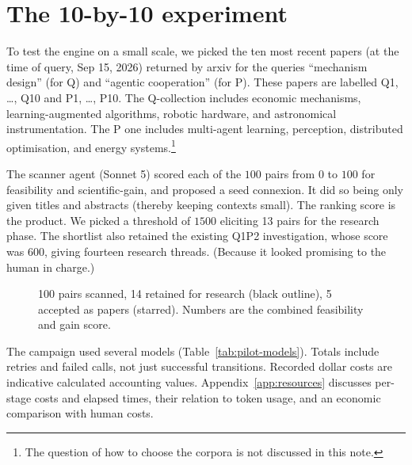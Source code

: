 \documentclass[11pt,a4paper]{article}
\newcommand{\pair}[1]{\mbox{#1}}
\begin{document}
\section{The 10-by-10 experiment}
\label{sec:pilot}


To test the engine on a small scale,
we picked the ten most recent papers (at the time of query, Sep 15, 2026)
returned by arxiv for the
queries ``mechanism design'' (for Q) and ``agentic cooperation'' (for P). These
papers are labelled Q1, \ldots, Q10 and P1, \ldots, P10. The Q-collection includes
economic mechanisms, learning-augmented algorithms, robotic hardware, and
astronomical instrumentation. The P one includes multi-agent learning,
perception, distributed optimisation, and energy systems.\footnote{The question
of how to choose the corpora is not discussed in this note.}

The scanner agent (Sonnet 5) scored each of the $100$ pairs from $0$ to $100$
for feasibility and scientific-gain, and proposed a seed connexion. It did so
being only given titles and abstracts (thereby keeping contexts small). The
ranking score is the product.
We picked a threshold of $1500$
eliciting 13 pairs for the research phase. The shortlist also retained the
existing Q1P2 investigation, whose score was $600$, giving fourteen research
threads. (Because it looked promising to the human in charge.)

\begin{figure}[htbp]
\centering
{}
  {}
  {} \caption{100 pairs scanned,
  14 retained for research (black outline),
  5 accepted as papers (starred).
  Numbers are the combined feasibility and gain score.
  }
\label{fig:pilot-heatmap}
\end{figure}

The campaign used several models (Table~\ref{tab:pilot-models}).
Totals include retries and failed calls, not just successful
transitions. %
Recorded dollar costs are indicative calculated accounting values.
Appendix~\ref{app:resources} discusses per-stage costs and elapsed times,
their relation to token usage, and an economic comparison with human costs.
\end{document}
